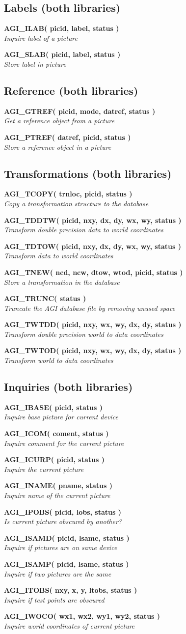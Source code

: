 \documentclass[twoside,11pt,nolof]{starlink}
\providecommand{\noteroutine}[2]{\textbf{#1}\hspace*{\fill}\nopagebreak \\
                             \hspace*{3em}\emph{#2}\hspace*{\fill}\par}
\begin{document}
\subsection{Labels (both libraries)}
\noteroutine{AGI\_ILAB( picid, label, status )}
        {Inquire label of a picture}
\noteroutine{AGI\_SLAB( picid, label, status )}
        {Store label in picture}

\subsection{Reference (both libraries)}
\noteroutine{AGI\_GTREF( picid, mode, datref, status )}
        {Get a reference object from a picture}
\noteroutine{AGI\_PTREF( datref, picid, status )}
        {Store a reference object in a picture}

\subsection{Transformations (both libraries)}
\noteroutine{AGI\_TCOPY( trnloc, picid, status )}
        {Copy a transformation structure to the database}
\noteroutine{AGI\_TDDTW( picid, nxy, dx, dy, wx, wy, status )}
        {Transform double precision data to world coordinates}
\noteroutine{AGI\_TDTOW( picid, nxy, dx, dy, wx, wy, status )}
        {Transform data to world coordinates}
\noteroutine{AGI\_TNEW( ncd, ncw, dtow, wtod, picid, status )}
        {Store a transformation in the database}
\noteroutine{AGI\_TRUNC( status )}
        {Truncate the AGI database file by removing unused space}
\noteroutine{AGI\_TWTDD( picid, nxy, wx, wy, dx, dy, status )}
        {Transform double precision world to data coordinates}
\noteroutine{AGI\_TWTOD( picid, nxy, wx, wy, dx, dy, status )}
        {Transform world to data coordinates}

\subsection{Inquiries (both libraries)}
\noteroutine{AGI\_IBASE( picid, status )}
        {Inquire base picture for current device}
\noteroutine{AGI\_ICOM( coment, status )}
        {Inquire comment for the current picture}
\noteroutine{AGI\_ICURP( picid, status )}
        {Inquire the current picture}
\noteroutine{AGI\_INAME( pname, status )}
        {Inquire name of the current picture}
\noteroutine{AGI\_IPOBS( picid, lobs, status )}
        {Is current picture obscured by another?}
\noteroutine{AGI\_ISAMD( picid, lsame, status )}
        {Inquire if pictures are on same device}
\noteroutine{AGI\_ISAMP( picid, lsame, status )}
        {Inquire if two pictures are the same}
\noteroutine{AGI\_ITOBS( nxy, x, y, ltobs, status )}
        {Inquire if test points are obscured}
\noteroutine{AGI\_IWOCO( wx1, wx2, wy1, wy2, status )}
        {Inquire world coordinates of current picture}
\end{document}
